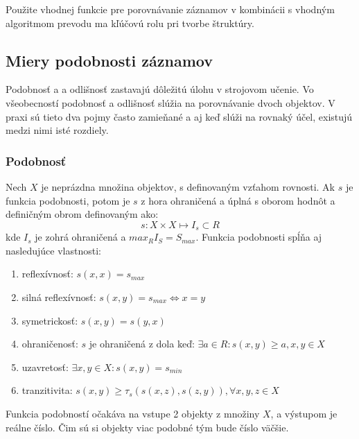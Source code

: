 \documentclass[slovak,master,dept460,male,cpp,cpdeclaration]{diploma}
\begin{document}
Použite vhodnej funkcie pre porovnávanie záznamov v kombinácii s vhodným algoritmom prevodu ma kľúčovú rolu pri tvorbe štruktúry.
\subsection{Miery podobnosti záznamov}
Podobnosť a a odlišnosť zastavajú dôležitú úlohu v strojovom učenie. Vo všeobecností podobnosť a odlišnosť slúžia na porovnávanie dvoch objektov. V praxi sú tieto dva pojmy často zamieňané a aj keď slúži na rovnaký účel, existujú medzi nimi isté rozdiely. 
\subsubsection{Podobnosť}
Nech $X$ je neprázdna množina objektov, s definovaným vzťahom rovnosti. Ak $s$ je funkcia podobnosti, potom je $s$ z hora ohraničená a úplná s oborom hodnôt a definičným obrom definovaným ako:
\begin{equation}
s: X \times X \mapsto I_s \subset R
\end{equation}
kde $I_s$ je zohrá ohraničená a $max_R I_S = S_{max}$.
Funkcia podobnosti spĺňa aj nasledujúce vlastnosti:
\begin{enumerate}
\item reflexívnosť: $s(x,x) = s_{max}$
\item silná reflexívnosť: $s(x,y) = s_{max} \iff x = y $
\item symetrickosť: $s(x,y) = s(y,x)$
\item ohraničenosť: $s$ je ohraničená z dola keď: $ \exists a \in R: s(x,y) \geq a, x,y \in X$
\item uzavretosť: $\exists  x,y \in X: s(x,y) = s_{min}$
\item tranzitivita: $s(x,y) \geq \tau_s(s(x,z), s(z,y)), \forall x,y,z \in X$
\end{enumerate}
Funkcia podobností očakáva na vstupe 2 objekty z množiny $X$, a výstupom je reálne číslo. Čim sú si objekty viac podobné tým bude číslo väčšie.
\end{document}
